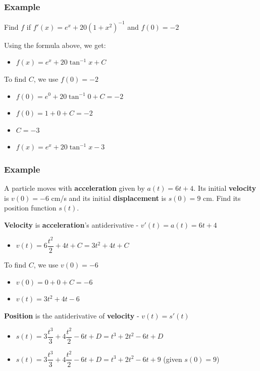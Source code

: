 \documentclass[t]{beamer}
\theoremstyle{plain}
\theoremstyle{definition}
\begin{document}
\begin{frame}

\frametitle{Example}

Find $f$ if $f'(x) = e^x + 20(1 + x^2)^{-1}$ and $f(0) = -2$ \pause

\medskip

Using the formula above, we get:
\begin{itemize}
	\item $f(x) = e^x + 20 \tan^{-1}x + C$
\end{itemize}

\medskip

To find $C$, we use $f(0) = -2$

\begin{itemize}
	\item $f(0) = e^0 + 20 \tan^{-1}0 + C = -2 $
	\item $f(0) = 1 + 0 + C = -2 $
	\item $C = -3$
	\item $f(x) = e^x + 20 \tan^{-1}x -3$
\end{itemize}

\end{frame}

\begin{frame}

\frametitle{Example}

\footnotesize

A particle moves with \textbf{acceleration} given by $a(t) = 6t + 4$.   Its initial \textbf{velocity} is $v(0) = -6$ cm/s and its initial \textbf{displacement} is $s(0) = 9$ cm.    Find its position function $s(t)$. \pause

\medskip

\textbf{Velocity} is \textbf{acceleration}'s antiderivative - $v'(t) = a(t) = 6t + 4$
\begin{itemize}
	\item $v(t) = 6\dfrac{t^2}{2} + 4t + C = 3t^2 + 4t + C$
\end{itemize}

\medskip

To find $C$, we use $v(0) = -6$
\begin{itemize}
	\item $v(0) = 0 + 0 + C = -6$
	\item $v(t) = 3t^2 + 4t - 6$
\end{itemize}

\medskip

\textbf{Position} is the antiderivative of \textbf{velocity} - $v(t) = s'(t)$
\begin{itemize}
	\item $s(t) = 3\dfrac{t^3}{3} + 4\dfrac{t^2}{2} - 6t + D = t^3 + 2t^2 - 6t + D$
	\item $s(t) = 3\dfrac{t^3}{3} + 4\dfrac{t^2}{2} - 6t + D = t^3 + 2t^2 - 6t + 9$  (given $s(0) = 9$)
\end{itemize}

\end{frame}
\end{document}
